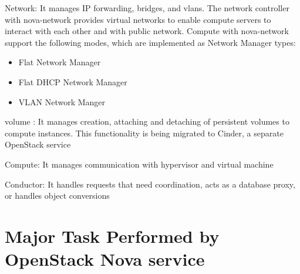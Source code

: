 \documentclass[9pt,twocolumn,twoside]{../../styles/osajnl}
\begin{document}
\begin{flushleft}

Network: It manages IP forwarding, bridges, and vlans. The network controller with nova-network provides virtual networks to enable compute servers to interact with each other and with public network. Compute with nova-network support the following modes, which are implemented as Network Manager types:
\begin{itemize}

\item Flat Network Manager

\item Flat DHCP Network Manager

\item VLAN Network Manger

\end{itemize}

\end{flushleft}


\begin{flushleft}

volume : It manages creation, attaching and detaching of persistent volumes to compute instances. This functionality is being migrated to Cinder, a separate OpenStack service

\end{flushleft}


\begin{flushleft}
Compute: It manages communication with hypervisor and virtual machine

\end{flushleft}


\begin{flushleft}

Conductor: It handles requests that need coordination, acts as a database proxy, or handles object conversions

\end{flushleft}


\section{Major Task Performed by OpenStack Nova service}

\end{document}
